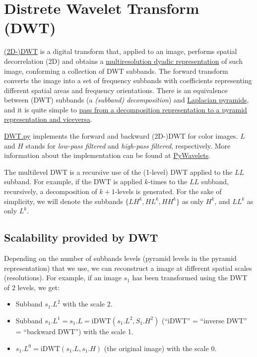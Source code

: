 \section{Distrete Wavelet Transform (DWT)}
\href{https://en.wikipedia.org/wiki/Discrete_wavelet_transform}{(2D-)DWT}
is a digital transform that, applied to an image, performs spatial
decorrelation (2D) and obtains a
\href{https://vicente-gonzalez-ruiz.github.io/image_transformations_for_coding/index.html#x1-3500024}{multiresolution
  dyadic representation} of such image, conforming a collection of DWT
subbands. The forward transform converts the image into a set of
frequency subbands with coefficients representing different spatial
areas and frequency orientations. There is an equivalence between
(DWT) subbands (a \emph{(subband) decomposition}) and
\href{http://fourier.eng.hmc.edu/e161/lectures/canny/node3.html}{Laplacian
  pyramids}, and it is quite simple to
\href{https://vicente-gonzalez-ruiz.github.io/pyramids-and-wavelets/}{pass
  from a decomposition representation to a pyramid representation and
  viceversa}.

\href{https://github.com/vicente-gonzalez-ruiz/MCDWT/blob/master/src/DWT.py}{DWT.py}
implements the forward and backward (2D-)DWT for color images. $L$ and
$H$ stands for \emph{low-pass filtered} and \emph{high-pass filtered},
respectively.  More information about the implementation can be found at
\href{https://pywavelets.readthedocs.io/en/latest/index.html}{PyWavelets}.



The multilevel DWT is a recursive use of the (1-level) DWT applied to
the $LL$ subband. For example, if the DWT is applied $k$-times to the
$LL$ subband, recursively, a decomposition of $k+1$-levels is generated. For
the sake of simplicity, we will denote the subbands $\{LH^k, HL^k,
HH^k\}$ as only $H^k$, and $LL^k$ as only $L^k$.

\subsection{Scalability provided by DWT}
Depending on the number of subbands levels (pyramid levels in the
pyramid representation) that we use, we can reconstruct a image at
different spatial scales (resolutions). For example, if an image $s_1$ has been transformed using the DWT of 2 levels, we get:
\begin{itemize}
\item Subband $s_1.L^2$ with the scale 2.
\item Subband $s_1.L^1=s_1.L=\text{iDWT}(s_1.L^2, S_1.H^2)$ (``iDWT'' =
  ``inverse DWT'' = ``backward DWT'') with the scale 1.
\item $s_1.L^0=\text{iDWT}(s_1.L, s_1.H)$ (the original image) with the scale 0.
\end{itemize}


